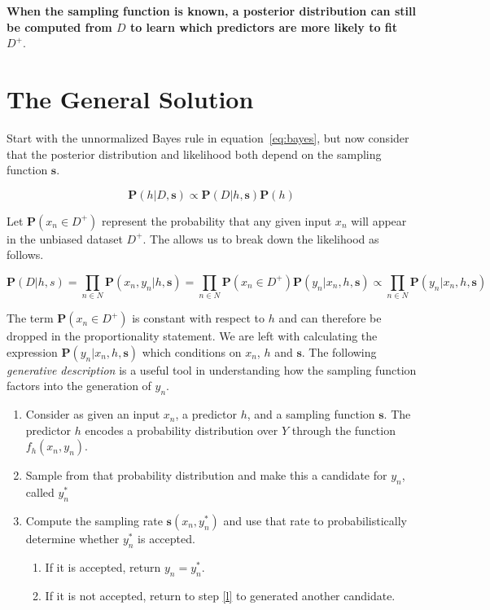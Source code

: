 \documentclass[twoside]{article}
\begin{document}
\textbf{When the sampling function is known, a posterior distribution can still be computed from \(D\) to learn which predictors are more likely to fit \(D^+\)}.

\section{The General Solution}
\label{section:solution}

Start with the unnormalized Bayes rule in equation~\eqref{eq:bayes}, but now consider that the posterior distribution and likelihood both depend on the sampling function \(\mathbf{s}\).

\[\mathbf{P}(h|D,\mathbf{s})\propto\mathbf{P}(D|h,\mathbf{s})\mathbf{P}(h)\]

Let \(\mathbf{P}(x_n \in D^+)\) represent the probability that any given input \(x_n\) will appear in the unbiased dataset \(D^+\). The allows us to break down the likelihood as follows.

\[\mathbf{P}(D|h,s)=\prod_{n \in N} \mathbf{P}(x_n,y_n|h,\mathbf{s})=\prod_{n \in N} \mathbf{P}(x_n \in D^+)\mathbf{P}(y_n|x_n,h,\mathbf{s})\propto\prod_{n \in N}\mathbf{P}(y_n|x_n,h,\mathbf{s})\]

The term \(\mathbf{P}(x_n \in D^+)\) is constant with respect to \(h\) and can therefore be dropped in the proportionality statement. We are left with calculating the expression \(\mathbf{P}(y_n|x_n,h,\mathbf{s})\) which conditions on \(x_n\), \(h\) and \(\mathbf{s}\). The following \textit{generative description} is a useful tool in understanding how the sampling function factors into the generation of \(y_n\).

\begin{enumerate}
	\item Consider as given an input \(x_n\), a predictor \(h\), and a sampling function \(\mathbf{s}\). The predictor \(h\) encodes a probability distribution over \(Y\) through the function \(f_h(x_n,y_n)\).
	\item \label{l} Sample from that probability distribution and make this a candidate for \(y_n\), called \(y_n^*\)
	\item Compute the sampling rate \(\mathbf{s}(x_n,y_n^*)\) and use that rate to probabilistically determine whether \(y_n^*\) is accepted.
    \begin{enumerate}
        \item If it is accepted, return \(y_n=y_n^*\).
        \item If it is not accepted, return to step \ref{l} to generated another candidate.
    \end{enumerate}
\end{enumerate}
\end{document}
